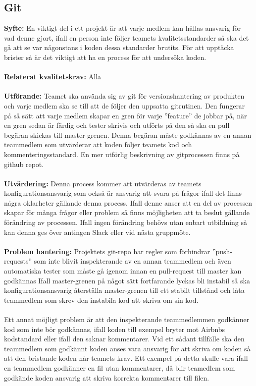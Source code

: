 \documentclass[10pt]{article}
\begin{document}
	\subsection{Git}
	\textbf{Syfte:} En viktigt del i ett projekt är att varje medlem kan hållas ansvarig för vad denne gjort, ifall en person inte följer teamets kvalitetsstandarder så ska det gå att se var någonstans i koden dessa standarder brutits. För att upptäcka brister så är det viktigt att ha en process för att undersöka koden.
	\\\\
	\textbf{Relaterat kvalitetskrav:} Alla
	\\\\
	\textbf{Utförande:} Teamet ska använda sig av git för versionshantering av produkten och varje medlem ska se till att de följer den uppsatta gitrutinen. Den fungerar på så sätt att varje medlem skapar en gren för varje ''feature'' de jobbar på, när en gren sedan är färdig och tester skrivis och utförts på den så ska en pull begäran skickas till master-grenen. Denna begäran måste godkännas av en annan teammedlem som utvärderar att koden följer teamets kod och kommenteringsstandard. En mer utförlig beskrivning av gitprocessen finns på github repot.
	\\\\
	\textbf{Utvärdering:} Denna process kommer att utvärderas av teamets konfigurationsansvarig som också är ansvarig att svara på frågor ifall det finns några oklarheter gällande denna process. Ifall denne anser att en del av processen skapar för många frågor eller problem så finns möjligheten att ta beslut gällande förändring av processen. Ifall ingen förändring behövs utan enbart utbildning så kan denna ges över antingen Slack eller vid nästa gruppmöte.
	\\\\
	\textbf{Problem hantering:} Projektets git-repo har regler som förhindrar ''push-requests'' som inte blivit inspekterande av en annan teammedlem och även automatiska tester som måste gå igenom innan en pull-request till master kan godkännas Ifall master-grenen på något sätt fortfarande lyckas bli instabil så ska konfigurationsansvarig återställa master-grenen till ett stabilt tillstånd och låta teammedlem som skrev den instabila kod att skriva om sin kod.\\\\
	Ett annat möjligt problem är att den inspekterande teammedlemmen godkänner kod som inte bör godkännas, ifall koden till exempel bryter mot Airbnbs kodstandard eller ifall den saknar kommentarer. Vid ett sådant tillfälle ska den teammedlem som godkännt koden anses vara ansvarig för att skriva om koden så att den bristande koden når teamets krav. Ett exempel på detta skulle vara ifall en teammedlem godkänner en fil utan kommentarer, då blir teamedlem som godkände koden ansvarig att skriva korrekta kommentarer till filen.
\end{document}
